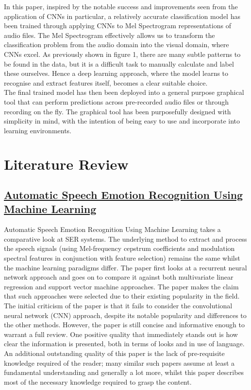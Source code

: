 \documentclass[12pt]{article}
\begin{document}
\noindent In this paper, inspired by the notable success and improvements seen from the application of CNNs in particular, a relatively accurate classification model has been trained through applying CNNs to Mel Spectrogram representations of audio files. The Mel Spectrogram effectively allows us to transform the classification problem from the audio domain into the visual domain, where CNNs excel. As previously shown in figure 1, there are many subtle patterns to be found in the data, but it is a difficult task to manually calculate and label these ourselves. Hence a deep learning approach, where the model learns to recognise and extract features itself, becomes a clear suitable choice.
\\

\noindent The final trained model has then been deployed into a general purpose graphical tool that can perform predictions across pre-recorded audio files or through recording on the fly. The graphical tool has been purposefully designed with simplicity in mind, with the intention of being easy to use and incorporate into learning environments.

\section{Literature Review}

\subsection{\href{https://www.intechopen.com/books/social-media-and-machine-learning/automatic-speech-emotion-recognition-using-machine-learning}{Automatic Speech Emotion Recognition Using Machine Learning}}
Automatic Speech Emotion Recognition Using Machine Learning takes a comparative look at SER systems. The underlying method to extract and process the speech signals (using Mel-frequency cepstrum coefficients and modulation spectral features in conjunction with feature selection) remains the same whilst the machine learning paradigms differ. The paper first looks at a recurrent neural network approach and goes on to compare it against both multivariate linear regression and support vector machine approaches. The paper makes the claim that such approaches were selected due to their existing popularity in the field. 
\\

\noindent The initial criticism of the paper is that it fails to consider the convolutional neural network (CNN) approach, despite its notable popularity and differences to the other methods. However, the paper is still concise and informative enough to warrant a full review. One positive quality that immediately stands out is how clear the information is presented, both in terms of looks and in use of language. An additional outstanding quality of this paper is the lack of pre-requisite knowledge required of the reader; many similar such papers assume at least a fundamental understanding and generally a lot more, whilst this paper describes most of the necessary knowledge required to grasp the content.
\\
\end{document}
